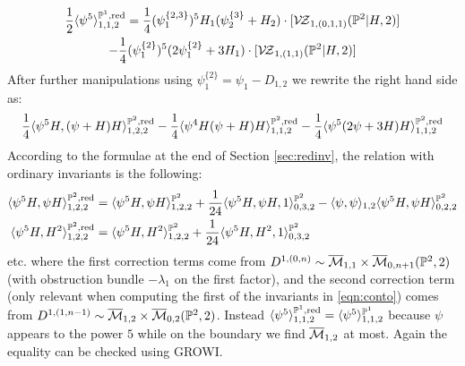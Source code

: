 \begin{ex}
\begin{multline*}
  \frac{1}{2}\langle \psi^5\rangle^{\mathbb P^1,\rm{red}}_{1,1,2}=\frac{1}{4}(\psi_1^{\{2,3\}})^5H_1(\psi_2^{\{3\}}+H_2)\cdot[\mathcal{V\!Z}_{1,(0,1,1)}(\mathbb P^2|H,2)] \\ -\frac{1}{4}(\psi_1^{\{2\}})^5(2\psi_1^{\{2\}}+3H_1)\cdot[\mathcal{V\!Z}_{1,(1,1)}(\mathbb P^2|H,2)]
 \end{multline*}
After further manipulations using $\psi_1^{\{2\}}=\psi_1-D_{1,2}$ we rewrite the right hand side as:
\begin{equation}\label{eqn:conto}
 \frac{1}{4}\langle\psi^5H,(\psi+H)H\rangle^{\mathbb P^2,\rm{red}}_{1,2,2}-\frac{1}{4}\langle\psi^4H(\psi+H)H\rangle^{\mathbb P^2,\rm{red}}_{1,1,2}-\frac{1}{4}\langle\psi^5(2\psi+3H)H\rangle^{\mathbb P^2,\rm{red}}_{1,1,2}
\end{equation}
According to the formulae at the end of Section \ref{sec:redinv}, the relation with ordinary invariants is the following:
\begin{align*}
 \langle\psi^5H,\psi H\rangle^{\mathbb P^2,\rm{red}}_{1,2,2}&=\langle\psi^5H,\psi H\rangle^{\mathbb P^2}_{1,2,2}+\frac{1}{24}\langle\psi^5H,\psi H,1\rangle^{\mathbb P^2}_{0,3,2}-\langle\psi,\psi\rangle_{1,2}\langle\psi^5H,\psi H\rangle^{\mathbb P^2}_{0,2,2}\\
 \langle\psi^5H,H^2\rangle^{\mathbb P^2,\rm{red}}_{1,2,2}&=\langle\psi^5H, H^2\rangle^{\mathbb P^2}_{1,2,2}+\frac{1}{24}\langle\psi^5H, H^2,1\rangle^{\mathbb P^2}_{0,3,2}
\end{align*}
\noindent etc. where the first correction terms come from $D^{1,(0,n)}\sim\overline{\mathcal{M}}_{1,1}\times\overline{\mathcal{M}}_{0,n+1}(\mathbb P^2,2)$ (with obstruction bundle $-\lambda_1$ on the first factor), and the second correction term (only relevant when computing the first of the invariants in \eqref{eqn:conto}) comes from $D^{1,(1,n-1)}\sim\overline{\mathcal{M}}_{1,2}\times\overline{\mathcal{M}}_{0,2}(\mathbb P^2,2)$. Instead $\langle \psi^5\rangle^{\mathbb P^1,\rm{red}}_{1,1,2}=\langle \psi^5\rangle^{\mathbb P^1}_{1,1,2}$ because $\psi$ appears to the power $5$ while on the boundary we find $\overline{\mathcal{M}}_{1,2}$ at most. Again the equality can be checked using GROWI.
\end{ex}

